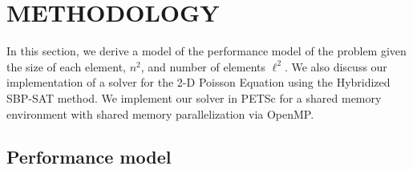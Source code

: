 % 
% 
%
\section{METHODOLOGY}

%
%
%
In this section, we derive a model of the performance model of the problem given the size of each element, $n^2$, and number of elements $\ell^2$.
We also discuss our implementation of a solver for the 2-D Poisson Equation using the Hybridized SBP-SAT method. 
We implement our solver in PETSc for a shared memory environment with shared memory parallelization via OpenMP.

%
%
%
\subsection{Performance model} 





